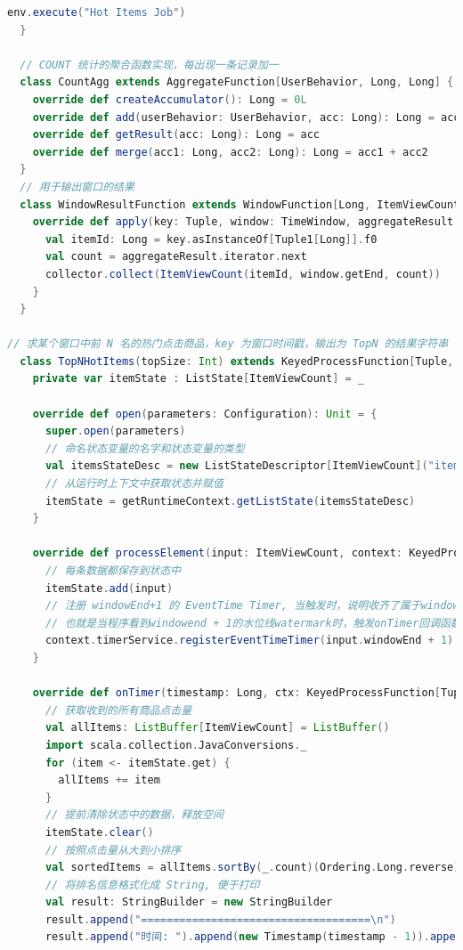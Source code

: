\documentclass[oneside]{ctexbook}
\begin{document}
\begin{lstlisting}[language=scala]
    env.execute("Hot Items Job")
  }

  // COUNT 统计的聚合函数实现，每出现一条记录加一
  class CountAgg extends AggregateFunction[UserBehavior, Long, Long] {
    override def createAccumulator(): Long = 0L
    override def add(userBehavior: UserBehavior, acc: Long): Long = acc + 1
    override def getResult(acc: Long): Long = acc
    override def merge(acc1: Long, acc2: Long): Long = acc1 + acc2
  }
  // 用于输出窗口的结果
  class WindowResultFunction extends WindowFunction[Long, ItemViewCount, Tuple, TimeWindow] {
    override def apply(key: Tuple, window: TimeWindow, aggregateResult: Iterable[Long], collector: Collector[ItemViewCount]) : Unit = {
      val itemId: Long = key.asInstanceOf[Tuple1[Long]].f0
      val count = aggregateResult.iterator.next
      collector.collect(ItemViewCount(itemId, window.getEnd, count))
    }
  }
 
// 求某个窗口中前 N 名的热门点击商品，key 为窗口时间戳，输出为 TopN 的结果字符串
  class TopNHotItems(topSize: Int) extends KeyedProcessFunction[Tuple, ItemViewCount, String] {
    private var itemState : ListState[ItemViewCount] = _

    override def open(parameters: Configuration): Unit = {
      super.open(parameters)
      // 命名状态变量的名字和状态变量的类型
      val itemsStateDesc = new ListStateDescriptor[ItemViewCount]("itemState-state", classOf[ItemViewCount])
      // 从运行时上下文中获取状态并赋值
      itemState = getRuntimeContext.getListState(itemsStateDesc)
    }

    override def processElement(input: ItemViewCount, context: KeyedProcessFunction[Tuple, ItemViewCount, String]#Context, collector: Collector[String]): Unit = {
      // 每条数据都保存到状态中
      itemState.add(input)
      // 注册 windowEnd+1 的 EventTime Timer, 当触发时，说明收齐了属于windowEnd窗口的所有商品数据
      // 也就是当程序看到windowend + 1的水位线watermark时，触发onTimer回调函数
      context.timerService.registerEventTimeTimer(input.windowEnd + 1)
    }

    override def onTimer(timestamp: Long, ctx: KeyedProcessFunction[Tuple, ItemViewCount, String]#OnTimerContext, out: Collector[String]): Unit = {
      // 获取收到的所有商品点击量
      val allItems: ListBuffer[ItemViewCount] = ListBuffer()
      import scala.collection.JavaConversions._
      for (item <- itemState.get) {
        allItems += item
      }
      // 提前清除状态中的数据，释放空间
      itemState.clear()
      // 按照点击量从大到小排序
      val sortedItems = allItems.sortBy(_.count)(Ordering.Long.reverse).take(topSize)
      // 将排名信息格式化成 String, 便于打印
      val result: StringBuilder = new StringBuilder
      result.append("====================================\n")
      result.append("时间: ").append(new Timestamp(timestamp - 1)).append("\n")


\end{lstlisting}
\end{document}
